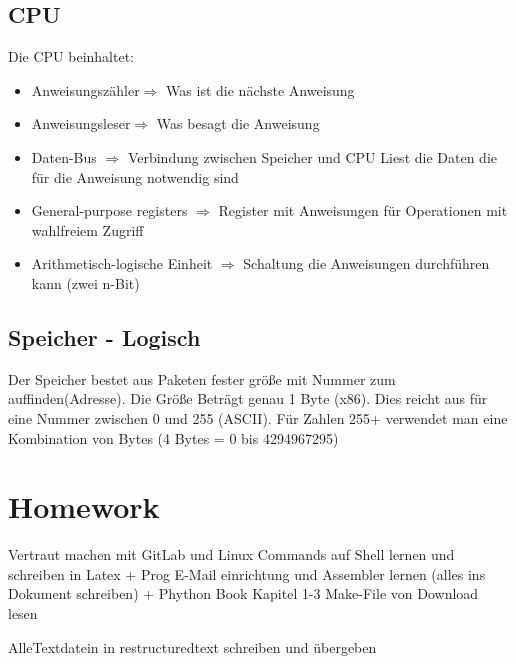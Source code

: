 \documentclass[a4paper,10pt]{scrartcl}
\begin{document}
\subsection{CPU}
Die CPU beinhaltet:
\begin{itemize}
    \item Anweisungszähler\newline $\Rightarrow$ Was ist die nächste Anweisung
    \item Anweisungsleser\newline $\Rightarrow$ Was besagt die Anweisung
    \item Daten-Bus $\Rightarrow$ Verbindung zwischen Speicher und CPU\newline
    Liest die Daten die für die Anweisung notwendig sind
    \item  General-purpose registers $\Rightarrow$ Register mit Anweisungen für Operationen mit wahlfreiem Zugriff
    \item Arithmetisch-logische Einheit $\Rightarrow$ Schaltung die Anweisungen durchführen kann (zwei n-Bit)
\end{itemize}

\subsection{Speicher - Logisch}
Der Speicher bestet aus Paketen fester größe mit Nummer zum auffinden(Adresse). Die Größe Beträgt genau 1 Byte (x86). Dies reicht aus für eine Nummer zwischen 0 und 255 (ASCII). Für Zahlen 255+ verwendet man eine Kombination von Bytes (4 Bytes = 0 bis 4294967295)





























\section{Homework}
Vertraut machen mit GitLab und Linux Commands auf Shell lernen und schreiben in Latex
+ Prog E-Mail einrichtung und Assembler lernen (alles ins Dokument schreiben)
+ Phython Book Kapitel 1-3
Make-File von Download lesen

AlleTextdatein in restructuredtext schreiben und übergeben
\end{document}
